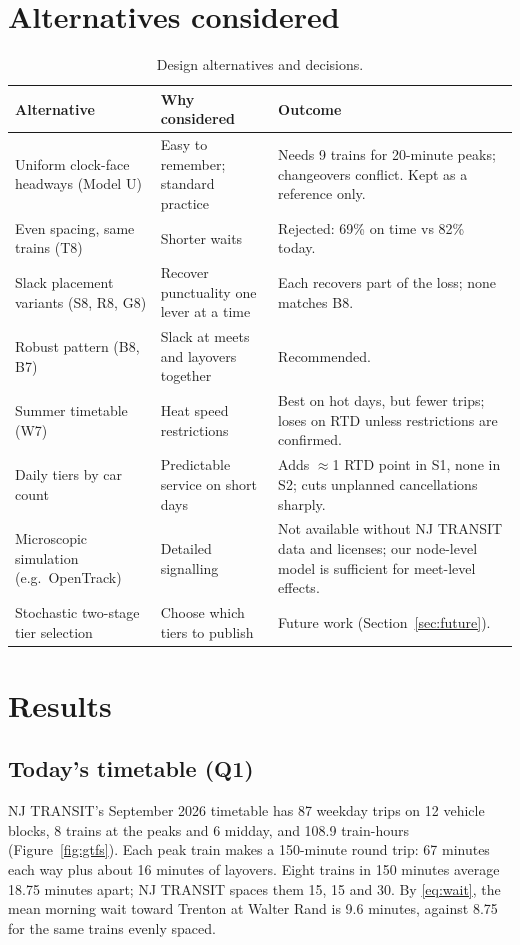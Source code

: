 \documentclass[11pt]{article}
\begin{document}
\section{Alternatives considered}\label{sec:alts}
\begin{table}[ht]\centering\small
\begin{tabularx}{\textwidth}{@{}p{3.4cm}LL@{}}
\toprule
Alternative & Why considered & Outcome \\ \midrule
Uniform clock-face headways (Model U) & Easy to remember; standard practice & Needs 9 trains for 20-minute peaks; changeovers conflict. Kept as a reference only. \\
Even spacing, same trains (T8) & Shorter waits & Rejected: 69\% on time vs 82\% today. \\
Slack placement variants (S8, R8, G8) & Recover punctuality one lever at a time & Each recovers part of the loss; none matches B8. \\
Robust pattern (B8, B7) & Slack at meets and layovers together & Recommended. \\
Summer timetable (W7) & Heat speed restrictions & Best on hot days, but fewer trips; loses on RTD unless restrictions are confirmed. \\
Daily tiers by car count & Predictable service on short days & Adds $\approx$1 RTD point in S1, none in S2; cuts unplanned cancellations sharply. \\
Microscopic simulation (e.g.\ OpenTrack) & Detailed signalling & Not available without NJ TRANSIT data and licenses; our node-level model is sufficient for meet-level effects. \\
Stochastic two-stage tier selection & Choose which tiers to publish & Future work (Section~\ref{sec:future}). \\
\bottomrule
\end{tabularx}
\caption{Design alternatives and decisions.}\label{tab:alts}
\end{table}

\section{Results}\label{sec:results}
\subsection{Today's timetable (Q1)}\label{sec:restoday}
NJ TRANSIT's September 2026 timetable has 87 weekday trips on 12 vehicle blocks, 8 trains at the peaks and 6 midday, and 108.9 train-hours (Figure~\ref{fig:gtfs}). Each peak train makes a 150-minute round trip: 67 minutes each way plus about 16 minutes of layovers. Eight trains in 150 minutes average 18.75 minutes apart; NJ TRANSIT spaces them 15, 15 and 30. By \eqref{eq:wait}, the mean morning wait toward Trenton at Walter Rand is 9.6 minutes, against 8.75 for the same trains evenly spaced.
\end{document}
